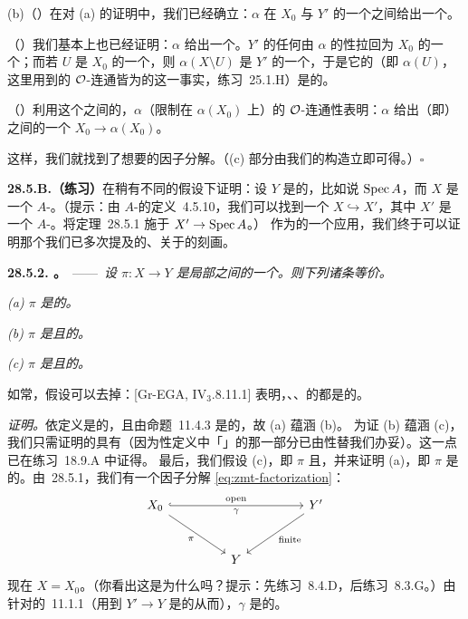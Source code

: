 (b)（\emph{\trSet}）在对 (a) 的证明中，我们已经确立：$\alpha$ 在 $X_0$ 与 $Y'$ 的一个\trOpenSubset{}之间给出一个\trBijection。

（\emph{\trTopology}）我们基本上也已经证明：$\alpha$ 给出一个\trHomeomorphism。$Y'$ 的任何\trOpenSubset{}由 $\alpha$ 的\trContinuous{}性拉回为 $X_0$ 的一个\trOpenSubset；而若 $U$ 是 $X_0$ 的一个\trOpenSubset，则 $\alpha(X\setminus U)$ 是 $Y'$ 的一个\trClosedSubset，于是它的\trComplement（即 $\alpha(U)$，这里用到\trProper{}的 $\mathcal{O}$-连通\trMorphism{}皆为\trSurjectiveMap{}的这一事实，\mbox{练习~25.1.H}）是\trOpen{}的。

（\emph{\trSheaf}）利用这个\trTopologicalSpace{}之间的\trIsomorphism，$\alpha$（限制在 $\alpha(X_0)$ 上）的 $\mathcal{O}$-连通性表明：$\alpha$ 给出\trLocallyRingedSpace（即\trScheme）之间的一个\trIsomorphism{} $X_0\to\alpha(X_0)$。

这样，我们就找到了想要的因子分解。（(c) 部分由我们的构造立即可得。）\hfill$\square$

\textbf{28.5.B.（练习）}\quad 在稍有不同的假设下证明\trZariskiMainTheorem：设 $Y$ 是\trAffine{}的，比如说 $\operatorname{Spec} A$，而 $X$ 是一个\trQuasiprojective{} $A$-\trScheme。（提示：由\trQuasiprojective{} $A$-\trScheme{}的\mbox{定义~4.5.10}，我们可以找到一个\trOpenEmbedding{} $X\hookrightarrow X'$，其中 $X'$ 是一个\trProjective{} $A$-\trScheme。将\mbox{定理~28.5.1} 施于 $X'\to\operatorname{Spec} A$。）
作为\trZariskiMainTheorem{}的一个应用，我们终于可以证明那个我们已多次提及的、关于\trFinite\trMorphism{}的刻画。

\textbf{28.5.2. \trhTheorem。}\ ——\ \emph{设 $\pi\colon X\to Y$ 是局部\trNoether{}\trScheme{}之间的一个\trMorphism。则下列诸条等价。}

\emph{(a) $\pi$ 是\trFinite{}的。}

\emph{(b) $\pi$ 是\trAffine{}且\trProper{}的。}

\emph{(c) $\pi$ 是\trProper{}且\trQuasifinite{}的。}

如常，\trNoether{}假设可以去掉：[Gr-EGA, IV$_3$.8.11.1] 表明，\trProper、\trQuasifinite、\trLocally\trFinitelyPresented{}的\trMorphism{}都是\trFinite{}的。

\emph{证明。}\quad \trFinite\trMorphism{}依定义是\trAffine{}的，且由\mbox{命题~11.4.3} 是\trProper{}的，故 (a) 蕴涵 (b)。
为证 (b) 蕴涵 (c)，我们只需证明\trAffine{}的\trProper\trMorphism{}具有\trFinite\trFiber（因为\trQuasifinite{}性定义中「\trFiniteType」的那一部分已由\trProper{}性替我们办妥）。这一点已在\mbox{练习~18.9.A} 中证得。
最后，我们假设 (c)，即 $\pi$ \trProper{}且\trQuasifinite，并来证明 (a)，即 $\pi$ 是\trFinite{}的。由\mbox{\trZariskiMainTheorem~28.5.1}，我们有一个因子分解 \eqref{eq:zmt-factorization}：
\[
\begin{tikzcd}[row sep=2.8em, column sep=4.5em]
X_0 \ar[rr, hook, "\text{open}", "\gamma"'] \ar[dr, "\pi"'] && Y' \ar[dl, "\text{finite}"] \\
& Y &
\end{tikzcd}
\]
现在 $X=X_0$。（你看出这是为什么吗？提示：先\mbox{练习~8.4.D}，后\mbox{练习~8.3.G}。）由针对\trProper\trMorphism{}的\mbox{\trCancellationTheorem~11.1.1}（用到 $Y'\to Y$ 是\trFinite{}的从而\trSeparated），$\gamma$ 是\trProper{}的。

